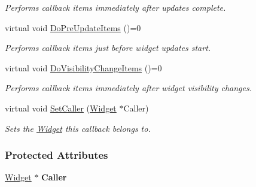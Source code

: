 \begin{DoxyCompactItemize}
\begin{DoxyCompactList}\small\item\em Performs callback items immediately after updates complete. \item\end{DoxyCompactList}\item 
\hypertarget{classMezzanine_1_1UI_1_1WidgetCallback_a2a5a9ed4a8bc31006d2d38d5c308999b}{
virtual void \hyperlink{classMezzanine_1_1UI_1_1WidgetCallback_a2a5a9ed4a8bc31006d2d38d5c308999b}{DoPreUpdateItems} ()=0}
\label{classMezzanine_1_1UI_1_1WidgetCallback_a2a5a9ed4a8bc31006d2d38d5c308999b}

\begin{DoxyCompactList}\small\item\em Performs callback items just before widget updates start. \item\end{DoxyCompactList}\item 
\hypertarget{classMezzanine_1_1UI_1_1WidgetCallback_a798717ddccdbb565c2284344b2ee0a63}{
virtual void \hyperlink{classMezzanine_1_1UI_1_1WidgetCallback_a798717ddccdbb565c2284344b2ee0a63}{DoVisibilityChangeItems} ()=0}
\label{classMezzanine_1_1UI_1_1WidgetCallback_a798717ddccdbb565c2284344b2ee0a63}

\begin{DoxyCompactList}\small\item\em Performs callback items immediately after widget visibility changes. \item\end{DoxyCompactList}\item 
\hypertarget{classMezzanine_1_1UI_1_1WidgetCallback_a3f3cc50759dfaff6c1af839595833a33}{
virtual void \hyperlink{classMezzanine_1_1UI_1_1WidgetCallback_a3f3cc50759dfaff6c1af839595833a33}{SetCaller} (\hyperlink{classMezzanine_1_1UI_1_1Widget}{Widget} $\ast$Caller)}
\label{classMezzanine_1_1UI_1_1WidgetCallback_a3f3cc50759dfaff6c1af839595833a33}

\begin{DoxyCompactList}\small\item\em Sets the \hyperlink{classMezzanine_1_1UI_1_1Widget}{Widget} this callback belongs to. \item\end{DoxyCompactList}\end{DoxyCompactItemize}
\subsubsection*{Protected Attributes}
\begin{DoxyCompactItemize}
\item 
\hypertarget{classMezzanine_1_1UI_1_1WidgetCallback_a44825154b17a4b800b3991b0c593e034}{
\hyperlink{classMezzanine_1_1UI_1_1Widget}{Widget} $\ast$ {\bfseries Caller}}
\label{classMezzanine_1_1UI_1_1WidgetCallback_a44825154b17a4b800b3991b0c593e034}

\end{DoxyCompactItemize}


